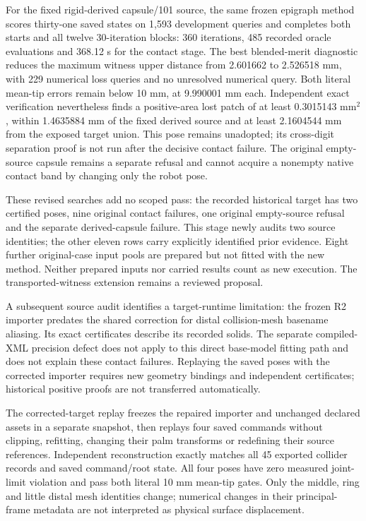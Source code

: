 \documentclass[10pt,letterpaper]{article}
\begin{document}
For the fixed rigid-derived capsule/101 source, the same frozen epigraph method
scores thirty-one saved states on 1,593 development queries and completes both
starts and all twelve 30-iteration blocks: 360 iterations, 485 recorded oracle
evaluations and 368.12 s for the contact stage. The best blended-merit diagnostic
reduces the maximum witness upper distance from 2.601662 to 2.526518 mm, with
229 numerical loss queries and no unresolved numerical query. Both literal
mean-tip errors remain below 10 mm, at 9.990001 mm each. Independent exact
verification nevertheless finds a positive-area lost patch of at least
0.3015143 $\mathrm{mm}^2$, within 1.4635884 mm of the fixed derived source and
at least 2.1604544 mm from the exposed target union. This pose remains unadopted;
its cross-digit separation proof is not run after the decisive contact failure.
The original empty-source capsule remains a separate refusal and cannot acquire
a nonempty native contact band by changing only the robot pose.

These revised searches add no scoped pass: the recorded historical target has
two certified poses, nine original contact failures, one original empty-source
refusal and the separate derived-capsule failure. This stage newly audits two
source identities; the other eleven rows carry explicitly identified prior
evidence. Eight further original-case input pools are prepared but not fitted
with the new method. Neither prepared inputs nor carried results count as new
execution. The transported-witness extension remains a reviewed proposal.

A subsequent source audit identifies a target-runtime limitation: the frozen
R2 importer predates the shared correction for distal collision-mesh basename
aliasing. Its exact certificates describe its recorded solids. The separate
compiled-XML precision defect does not apply to this direct base-model fitting
path and does not explain these contact failures. Replaying the saved poses
with the corrected importer requires new geometry bindings and independent
certificates; historical positive proofs are not transferred automatically.

The corrected-target replay freezes the repaired importer and unchanged declared
assets in a separate snapshot, then replays four saved commands without clipping,
refitting, changing their palm transforms or redefining their source references.
Independent reconstruction exactly matches all 45 exported collider records and
saved command/root state. All four poses have zero measured joint-limit
violation and pass both literal 10 mm mean-tip gates. Only the middle, ring and
little distal mesh identities change; numerical changes in their principal-frame
metadata are not interpreted as physical surface displacement.
\end{document}
